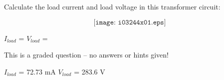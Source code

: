

Calculate the load current and load voltage in this transformer circuit:

$$\texttt{[image: i03244x01.eps]}$$

\vskip 10pt

$I_{load}$ = \hskip 100pt $V_{load}$ =

\vfil 

\eject






This is a graded question -- no answers or hints given!
 






$I_{load}$ = 72.73 mA \hskip 80pt $V_{load}$ = 283.6 V




